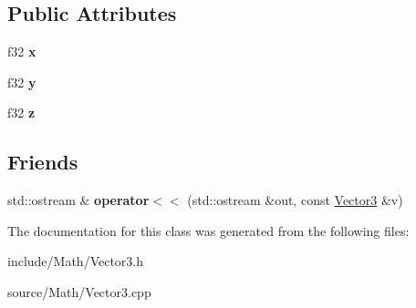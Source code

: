 \subsection*{Public Attributes}
\begin{DoxyCompactItemize}
\item 
f32 {\bfseries x}\hypertarget{classDE_1_1Vector3_afcd8c2a48176d6e58eda484f6224c930}{}\label{classDE_1_1Vector3_afcd8c2a48176d6e58eda484f6224c930}

\item 
f32 {\bfseries y}\hypertarget{classDE_1_1Vector3_a2f1d86e3fb605a676d5d21460396ac65}{}\label{classDE_1_1Vector3_a2f1d86e3fb605a676d5d21460396ac65}

\item 
f32 {\bfseries z}\hypertarget{classDE_1_1Vector3_aa0b78146ee48701acdc4e6bfc095c5e3}{}\label{classDE_1_1Vector3_aa0b78146ee48701acdc4e6bfc095c5e3}

\end{DoxyCompactItemize}
\subsection*{Friends}
\begin{DoxyCompactItemize}
\item 
std\+::ostream \& {\bfseries operator$<$$<$} (std\+::ostream \&out, const \hyperlink{classDE_1_1Vector3}{Vector3} \&v)\hypertarget{classDE_1_1Vector3_a6b8025c0424ba8db565d3153d8dc9c0e}{}\label{classDE_1_1Vector3_a6b8025c0424ba8db565d3153d8dc9c0e}

\end{DoxyCompactItemize}


The documentation for this class was generated from the following files\+:\begin{DoxyCompactItemize}
\item 
include/\+Math/Vector3.\+h\item 
source/\+Math/Vector3.\+cpp\end{DoxyCompactItemize}

